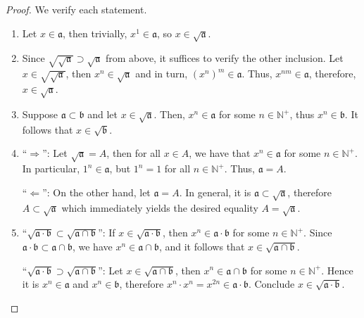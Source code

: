 \documentclass[a4paper]{book}
\theoremstyle{definition}
\begin{document}
\begin{proof}
    We verify each statement.
    \begin{enumerate}
        \item Let \(x \in \mathfrak{a}\), then trivially, \(x^1 \in \mathfrak{a}\), so \(x \in \sqrt{\mathfrak{a}}\).
        


        \item Since \(\sqrt{\sqrt{\mathfrak{a}}} \supset \sqrt{\mathfrak{a}}\) from above, it suffices to verify the other inclusion. Let \(x \in \sqrt{\sqrt{\mathfrak{a}}}\), then \(x^n \in \sqrt{\mathfrak{a}}\) and in turn, \(\left(x^n\right)^m \in \mathfrak{a}\). Thus, \(x^{nm} \in \mathfrak{a}\), therefore, \(x \in \sqrt{\mathfrak{a}}\).
        
        
        
        \item Suppose \(\mathfrak{a} \subset \mathfrak{b}\) and let \(x \in \sqrt{\mathfrak{a}}\). Then, \(x^n \in \mathfrak{a}\) for some \(n \in \mathbb{N}^+\), thus \(x^n \in \mathfrak{b}\). It follows that \(x \in \sqrt{\mathfrak{b}}\).
        


        \item ``\(\Rightarrow\)'': Let \(\sqrt{\mathfrak{a}} = A\), then for all \(x \in A\), we have that \(x^n \in \mathfrak{a}\) for some \(n \in \mathbb{N}^+\). In particular, \(1^n \in \mathfrak{a}\), but \(1^n = 1\) for all \(n \in \mathbb{N}^+\). Thus, \(\mathfrak{a} = A\).
        
        ``\(\Leftarrow\)'': On the other hand, let \(\mathfrak{a} = A\). In general, it is \(\mathfrak{a} \subset \sqrt{\mathfrak{a}}\), therefore \(A \subset \sqrt{\mathfrak{a}}\) which immediately yields the desired equality \(A = \sqrt{\mathfrak{a}}\).



        \item ``\(\sqrt{\mathfrak{a} \cdot \mathfrak{b}} \subset \sqrt{\mathfrak{a} \cap \mathfrak{b}}\)'': If \(x \in \sqrt{\mathfrak{a} \cdot \mathfrak{b}}\), then \(x^n \in \mathfrak{a} \cdot \mathfrak{b}\) for some \(n \in \mathbb{N}^+\). Since \(\mathfrak{a} \cdot \mathfrak{b} \subset \mathfrak{a} \cap \mathfrak{b}\), we have \(x^n \in \mathfrak{a} \cap \mathfrak{b}\), and it follows that \(x \in \sqrt{\mathfrak{a} \cap \mathfrak{b}}\).
        
        ``\(\sqrt{\mathfrak{a} \cdot \mathfrak{b}} \supset \sqrt{\mathfrak{a} \cap \mathfrak{b}}\)'': Let \(x \in \sqrt{\mathfrak{a} \cap \mathfrak{b}}\), then \(x^n \in \mathfrak{a} \cap \mathfrak{b}\) for some \(n \in \mathbb{N}^+\). Hence it is \(x^n \in \mathfrak{a}\) and \(x^n \in \mathfrak{b}\), therefore \(x^n \cdot x^n = x^{2n} \in \mathfrak{a} \cdot \mathfrak{b}\). Conclude \(x \in \sqrt{\mathfrak{a} \cdot \mathfrak{b}}\).


\end{enumerate}
\end{proof}
\end{document}
